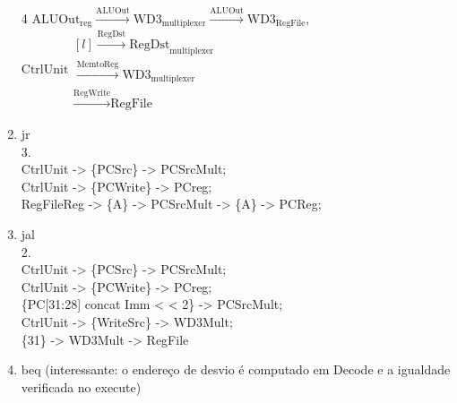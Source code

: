 \documentclass{article}
\begin{document}
\begin{enumerate}
\bigbreak

4 $\text{ALUOut}_\text{reg} \xrightarrow{\text{ALUOut}} \text{WD3}_\text{multiplexer} \xrightarrow{\text{ALUOut}} \text{WD3}_\text{RegFile}$,  $\text{CtrlUnit} \begin{matrix*}[l] 
\xrightarrow{\text{RegDst}} \text{RegDst}_\text{multiplexer} \\ \xrightarrow{\text{MemtoReg}} \text{WD3}_\text{multiplexer} \\ \xrightarrow{\text{RegWrite}} \text{RegFile} \end{matrix*}$\\

\bigbreak

    \item jr\\

3.\\
CtrlUnit -> \{PCSrc\} -> PCSrcMult;\\
CtrlUnit -> \{PCWrite\} -> PCreg;\\
RegFileReg -> \{A\} -> PCSrcMult -> \{A\} -> PCReg;\\

\bigbreak

    \item jal\\

2.\\
CtrlUnit -> \{PCSrc\} -> PCSrcMult;\\
CtrlUnit -> \{PCWrite\} -> PCreg;\\
\{PC[31:28] concat Imm < < 2\} -> PCSrcMult;\\
CtrlUnit -> \{WriteSrc\} -> WD3Mult;\\
\{31\} -> WD3Mult -> RegFile

\bigbreak

    \item beq (interessante: o endereço de desvio é computado em Decode e a igualdade verificada no execute)\\


\end{enumerate}
\end{document}
